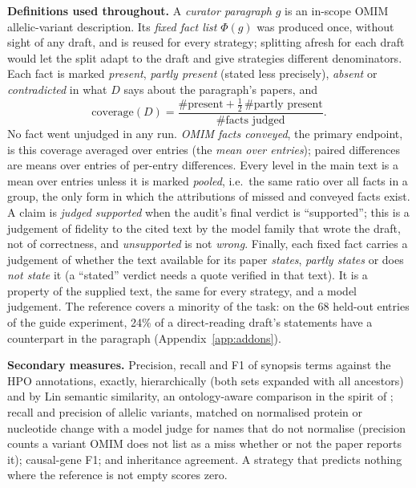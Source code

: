 \documentclass{article} %
\begin{document}
\textbf{Definitions used throughout.} A \emph{curator paragraph} $g$ is an in-scope OMIM allelic-variant description. Its \emph{fixed fact list} $\Phi(g)$ was produced once, without sight of any draft, and is reused for every strategy; splitting afresh for each draft would let the split adapt to the draft and give strategies different denominators. Each fact is marked \emph{present}, \emph{partly present} (stated less precisely), \emph{absent} or \emph{contradicted} in what $D$ says about the paragraph's papers, and
\begin{equation}
\text{coverage}(D)=\frac{\#\text{present}+\tfrac12\,\#\text{partly present}}{\#\text{facts judged}} .
\end{equation}
No fact went unjudged in any run. \emph{OMIM facts conveyed}, the primary endpoint, is this coverage averaged over entries (the \emph{mean over entries}); paired differences are means over entries of per-entry differences. Every level in the main text is a mean over entries unless it is marked \emph{pooled}, i.e.\ the same ratio over all facts in a group, the only form in which the attributions of missed and conveyed facts exist. A claim is \emph{judged supported} when the audit's final verdict is ``supported''; this is a judgement of fidelity to the cited text by the model family that wrote the draft, not of correctness, and \emph{unsupported} is not \emph{wrong}. Finally, each fixed fact carries a judgement of whether the text available for its paper \emph{states}, \emph{partly states} or does \emph{not state} it (a ``stated'' verdict needs a quote verified in that text). It is a property of the supplied text, the same for every strategy, and a model judgement. The reference covers a minority of the task: on the 68 held-out entries of the guide experiment, 24\% of a direct-reading draft's statements have a counterpart in the paragraph (Appendix~\ref{app:addons}).

\textbf{Secondary measures.} Precision, recall and F1 of synopsis terms against the HPO annotations, exactly, hierarchically (both sets expanded with all ancestors) and by Lin semantic similarity, an ontology-aware comparison in the spirit of \citet{Khler2009ClinicalDiagnostics}; recall and precision of allelic variants, matched on normalised protein or nucleotide change with a model judge for names that do not normalise (precision counts a variant OMIM does not list as a miss whether or not the paper reports it); causal-gene F1; and inheritance agreement. A strategy that predicts nothing where the reference is not empty scores zero.
\end{document}
